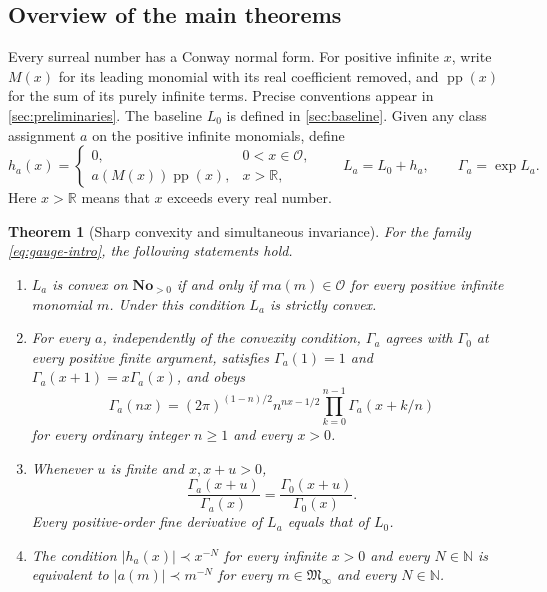 \documentclass[11pt,letterpaper]{article}
\numberwithin{equation}{section}
\newtheorem{theorem}{Theorem}[section]
\theoremstyle{plain}
\theoremstyle{definition}
\theoremstyle{remark}
\newcommand{\No}{\mathbf{No}}
\newcommand{\R}{\mathbb R}
\newcommand{\N}{\mathbb N}
\newcommand{\Ocal}{\mathcal O}
\newcommand{\Minf}{\mathfrak M_{\infty}}
\newcommand{\pp}{\operatorname{pp}}
\newcommand{\abs}[1]{\lvert#1\rvert}
\begin{document}
\subsection{Overview of the main theorems}
Every surreal number has a Conway normal form. For positive infinite $x$,
write $M(x)$ for its leading monomial with its real coefficient removed, and
$\pp(x)$ for the sum of its purely infinite terms. Precise conventions appear
in \cref{sec:preliminaries}. The baseline $L_0$ is defined in
\cref{sec:baseline}. Given any class assignment $a$ on the positive infinite
monomials, define
\begin{equation}\label{eq:gauge-intro}
 h_a(x)=
 \begin{cases}
 0,&0<x\in\Ocal,\\
 a(M(x))\pp(x),&x>\R,
 \end{cases}
 \qquad L_a=L_0+h_a,\qquad \Gamma_a=\exp L_a.
\end{equation}
Here $x>\R$ means that $x$ exceeds every real number.

\begin{theorem}[Sharp convexity and simultaneous invariance]\label{thm:main}
For the family \eqref{eq:gauge-intro}, the following statements hold.
\begin{enumerate}[label=(\roman*)]
\item $L_a$ is convex on $\No_{>0}$ if and only if
$m a(m)\in\Ocal$ for every positive infinite monomial $m$. Under this
condition $L_a$ is strictly convex.
\item For every $a$, independently of the convexity condition,
$\Gamma_a$ agrees with $\Gamma_0$ at every positive finite argument,
satisfies $\Gamma_a(1)=1$ and $\Gamma_a(x+1)=x\Gamma_a(x)$, and obeys
\begin{equation}\label{eq:gauss-intro}
 \Gamma_a(nx)=(2\pi)^{(1-n)/2}n^{nx-1/2}
 \prod_{k=0}^{n-1}\Gamma_a(x+k/n)
\end{equation}
for every ordinary integer $n\ge1$ and every $x>0$.
\item Whenever $u$ is finite and $x,x+u>0$,
\begin{equation}\label{eq:ratio-intro}
 \frac{\Gamma_a(x+u)}{\Gamma_a(x)}
 =\frac{\Gamma_0(x+u)}{\Gamma_0(x)}.
\end{equation}
Every positive-order fine derivative of $L_a$ equals that of $L_0$.
\item The condition
$\abs{h_a(x)}\prec x^{-N}$ for every infinite $x>0$ and every
$N\in\N$ is equivalent to
$\abs{a(m)}\prec m^{-N}$ for every $m\in\Minf$ and every $N\in\N$.
\end{enumerate}
\end{theorem}
\end{document}
